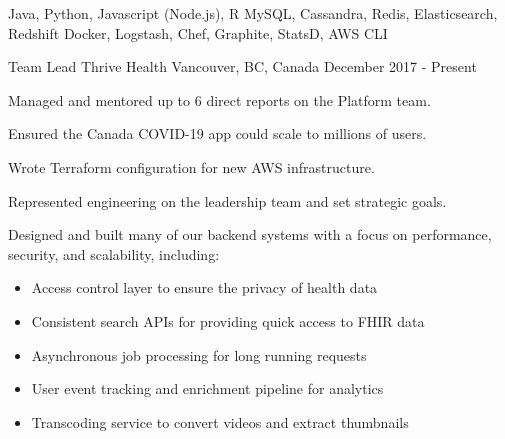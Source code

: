 \begin{cvskills}
   {Java, Python, Javascript (Node.js), R}
   {MySQL, Cassandra, Redis, Elasticsearch, Redshift}
   {Docker, Logstash, Chef, Graphite, StatsD, AWS CLI}
\end{cvskills}




\begin{cventries}

  \cventry
    {Team Lead} %
    {Thrive Health} %
    {Vancouver, BC, Canada} %
    {December 2017 - Present} %
    {
      \begin{cvitems} %
        \item {Managed and mentored up to 6 direct reports on the Platform team.}
        \item {Ensured the Canada COVID-19 app could scale to millions of users.}
        \item {Wrote Terraform configuration for new AWS infrastructure.}
        \item {Represented engineering on the leadership team and set strategic goals.}
        \item {Designed and built many of our backend systems with a focus on performance, security, and scalability, including:}
        \begin{itemize}
          \item {Access control layer to ensure the privacy of health data}
          \item {Consistent search APIs for providing quick access to FHIR data}
          \item {Asynchronous job processing for long running requests}
          \item {User event tracking and enrichment pipeline for analytics}
          \item {Transcoding service to convert videos and extract thumbnails}
        \end{itemize}
      \end{cvitems}
    }


\end{cventries}
